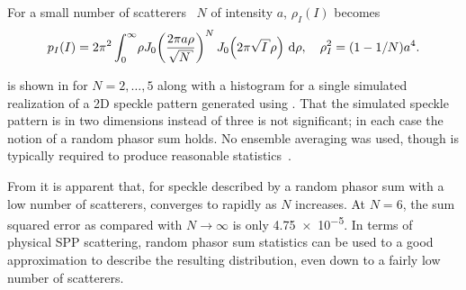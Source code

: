 For a small number of scatterers~\cite{jakeman1984speckle} $N$ of intensity
$a$, $\rho_I(I)$ becomes~\cite{goodman2007speckle}
\begin{equation}
p_I(I) = 2\pi^2 \int_0^\infty\! \rho J_0\!\left(\frac{2\pi a
\rho}{\sqrt{N}}\right)^N J_0\!\left(2\pi\sqrt{I}\rho\right)\md\rho,\quad \rho_I^2=(1-1/N)a^4.
\label{eqn:smallscatteqn}
\end{equation}

 is shown in  for
$N=2,\ldots,5$ along with a histogram for a single simulated realization of a
2D speckle pattern generated using .  That the
simulated speckle pattern is in two dimensions instead of three is not
significant; in each case the notion of a random phasor sum holds.  No ensemble
averaging was used, though is typically required to produce reasonable
statistics~\cite{goodman2007speckle}.

From  it is apparent that, for speckle described by a
random phasor sum with a low number of scatterers,
 converges to  rapidly as $N$
increases.  At $N=6$, the sum squared error as compared with $N\to\infty$ is
only \num{4.75e-5}.  In terms of physical SPP scattering, random phasor sum
statistics can be used to a good approximation to describe the resulting
distribution, even down to a fairly low number of scatterers.

